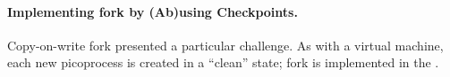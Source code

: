 


\begin{comment}
\vspace{5pt}
\noindent{\bf Guest self-migration.~}  One of the key features of the host ABI
is that guest state can be programmatically read and recreated.
As a result, guests can checkpoint, migrate, and resume themselves in a new picoprocess,
potentially on a new host.  
Most of the library OS and application state are checkpointed simply 
by copying the contents of virtual memory into a file.
Checkpointing requires manually serializing a few key data structures
in {\tt libLinux} that are needed to resume the library OS from a checkpoint,
including the thread states, handle table, and memory mappings.  

Resuming from a checkpoint involves restoring these key data
structures (handles, thread register contexts, memory mappings), and re-loading memory
contents from the checkpoint.  Most additional data structures
in {\tt libLinux}, and all application data structures,
are reloaded at the virtual address as before the checkpoint and work without modification.
\end{comment}

\begin{comment}
When a new guest begins execution, an input argument to {\tt libLinux} indicates
whether control should be transferred to the Linux loader ({\tt ld.so}) to start a new application instance, 
or whether a checkpoint should be loaded instead.
\end{comment}

\paragraph{Implementing fork by (Ab)using Checkpoints.} 
Copy-on-write fork presented a particular challenge.
As with a virtual machine, each new picoprocess 
is created in a ``clean'' state; fork is implemented in the \libos{}.

